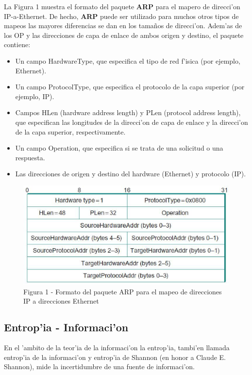 \documentclass[a4paper,10pt]{article}
\begin{document}
\vspace*{5 mm}
La Figura 1 muestra el formato del paquete \textbf{ARP} para el mapero de direcci'on IP-a-Ethernet. De hecho, \textbf{ARP} puede ser utilizado para muchos otros tipos de mapeos las mayores diferencias se dan en los tama\~nos de direcci'on. Adem'as de los OP y las direcciones de capa de enlace de ambos origen y destino, el paquete contiene:

\begin{itemize}
	\item Un campo HardwareType, que especifica el tipo de red f'isica (por ejemplo, Ethernet).
	\item Un campo ProtocolType, que especifica el protocolo de la capa superior (por ejemplo, IP).
	\item Campos HLen (hardware address length) y PLen (protocol address length), que especifican las longitudes de la direcci'on de capa de enlace y la direcci'on de la capa superior, respectivamente.
	\item Un campo Operation, que especifica si se trata de una solicitud o una respuesta.
	\item Las direcciones de origen y destino del hardware (Ethernet) y protocolo (IP).
\end{itemize}

\begin{figure}[!hbp]
\begin{center}
\includegraphics[width=12cm]{figura1.eps}
\end{center}
\caption{Figura 1 - Formato del paquete ARP para el mapeo de direcciones IP a direcciones Ethernet} \label{figura1}
\end{figure}

\subsection{Entrop'ia - Informaci'on}

En el 'ambito de la teor'ia de la informaci'on la entrop'ia, tambi'en llamada entrop'ia de la informaci'on y entrop'ia de Shannon (en honor a Claude E. Shannon), mide la incertidumbre de una fuente de informaci'on.
\end{document}
